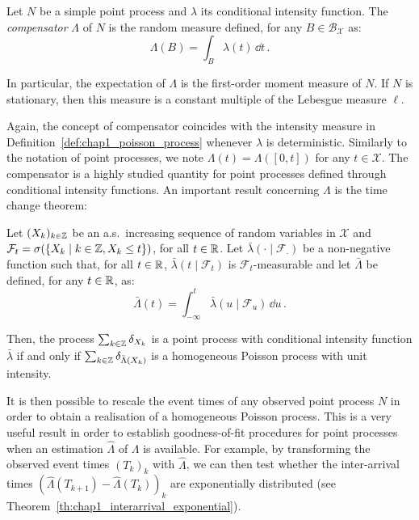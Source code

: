 \begin{definition}
    Let $N$ be a simple point process and $\lambda$ its conditional intensity function.
    The \emph{compensator} $\Lambda$ of $N$ is the random measure defined, for any $B\in\mathcal{B}_{\mathcal{X}}$ as:
    \[\Lambda(B) = \int_{B}{\lambda(t)\,\dd t}\,.\]

    In particular, the expectation of $\Lambda$ is the first-order moment measure of $N$.
    If $N$ is stationary, then this measure is a constant multiple of the Lebesgue measure $\ell$.
\end{definition}
Again, the concept of compensator coincides with the intensity measure in Definition~\ref{def:chap1_poisson_process} whenever $\lambda$ is deterministic.
Similarly to the notation of point processes, we note $\Lambda(t) = \Lambda([0,t])$ for any $t\in\mathcal{X}$.
The compensator is a highly studied quantity for point processes defined through conditional intensity functions.
An important result concerning $\Lambda$ is the time change theorem:

\begin{theorem}{\parencite[Theorem 7.4.IV]{DaleyV1}}

    Let $(X_k)_{k\in{\mathbb Z}}$ be an a.s.\ increasing sequence of random variables in $\mathcal{X}$ and $\mathcal{F}_t = \sigma(\{X_k \mid k\in{\mathbb Z}, X_k\leq t\})$, for all $t\in{\mathbb R}$.
    Let $\bar\lambda(\cdot\mid \mathcal{F}_{\cdot})$ be a non-negative function such that, for all $t\in{\mathbb R}$, $\bar\lambda(t\mid \mathcal{F}_{t})$ is $\mathcal{F}_t$-measurable and let $\bar\Lambda$ be defined, for any $t\in{\mathbb R}$, as:
    \[\bar\Lambda(t) = \int_{-\infty}^{t}{\bar\lambda(u\mid\mathcal{F}_u)\,\dd u}\,.\]

    Then, the process $\sum_{k\in{\mathbb Z}}{\delta_{X_k}}$ is a point process with conditional intensity function $\bar\lambda$ if and only if $\sum_{k\in{\mathbb Z}}{\delta_{\bar\Lambda(X_k)}}$ is a homogeneous Poisson process with unit intensity.
\end{theorem}
It is then possible to rescale the event times of any observed point process $N$ in order to obtain a realisation of a homogeneous Poisson process.
This is a very useful result in order to establish goodness-of-fit procedures for point processes when an estimation $\hat \Lambda$ of $\Lambda$ is available.
For example, by transforming the observed event times $(T_k)_k$ with $\hat \Lambda$, we can then test whether the inter-arrival times $(\hat \Lambda(T_{k+1}) - \hat \Lambda(T_k))_k$ are exponentially distributed (see Theorem~\ref{th:chap1_interarrival_exponential}).


